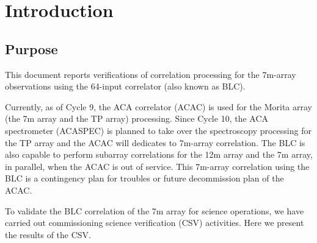 \clearpage

\section{Introduction}
\thispagestyle{fancy}


\subsection{Purpose}
This document reports verifications of correlation processing for the 7m-array observations using the 64-input correlator (also known as BLC).

Currently, as of Cycle 9, the ACA correlator (ACAC) is used for the Morita array (the 7m array and the TP array) processing. Since Cycle 10, the ACA spectrometer (ACASPEC) is planned to take over the spectroscopy processing for the TP array and the ACAC will dedicates to 7m-array correlation.
The BLC is also capable to perform subarray correlations for the 12m array and the 7m array, in parallel, when the ACAC is out of service. This 7m-array correlation using the BLC is a contingency plan for troubles or future decommission plan of the ACAC.

To validate the BLC correlation of the 7m array for science operations, we have carried out commissioning science verification (CSV) activities. Here we present the results of the CSV.


